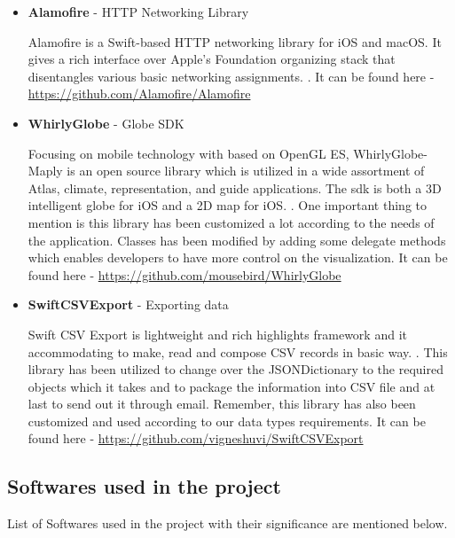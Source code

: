 \begin{itemize}
    \item \textbf{Alamofire} - HTTP Networking Library
    
    Alamofire is a Swift-based HTTP networking library for \gls{iOS} and \gls{macOS}. It gives a rich interface over Apple's Foundation organizing stack that disentangles various basic networking assignments. \cite{Alamofire}. It can be found here - \url{https://github.com/Alamofire/Alamofire} \\
   
    \item \textbf{WhirlyGlobe} - Globe SDK
    
    Focusing on mobile technology with based on OpenGL ES, WhirlyGlobe-Maply is an open source library which is utilized in a wide assortment of Atlas, climate, representation, and guide applications. The \gls{sdk} is both a 3D intelligent globe for \gls{iOS} and a 2D map for \gls{iOS}. \cite{WhirlyGlobe}. One important thing to mention is this library has been customized a lot according to the needs of the application. Classes has been modified by adding some delegate methods which enables developers to have more control on the visualization. It can be found here - \url{https://github.com/mousebird/WhirlyGlobe} \\
    
    \item \textbf{SwiftCSVExport} - Exporting data
    
    Swift CSV Export is lightweight and rich highlights framework and it accommodating to make, read and compose CSV records in basic way. \cite{Swift_CSV_Export}. This library has been utilized to change over the JSONDictionary to the required objects which it takes and to package the information into CSV file and at last to send out it through email. Remember, this library has also been customized and used according to our data types requirements. It can be found here - \url{https://github.com/vigneshuvi/SwiftCSVExport} \\ 
    
\end{itemize}

\subsection{Softwares used in the project}

List of Softwares used in the project with their significance are mentioned below.

